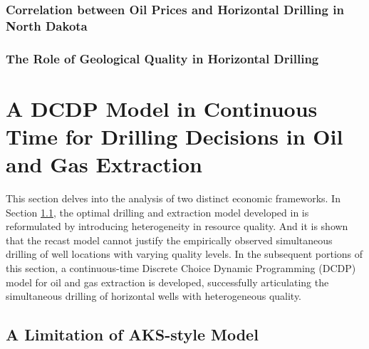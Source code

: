 \subsubsection{Correlation between Oil Prices and Horizontal Drilling in North Dakota}
\label{C3-SubSubSection:Correlation-between-Oil-Prices-and-Horizontal-Drilling-in-ND}


\subsubsection{The Role of Geological Quality in Horizontal Drilling}
\label{C3-SubSubSection:The-Role-of-Geological-Quality-in-Horizontal-Drilling}






\section{A DCDP Model in Continuous Time for Drilling Decisions in Oil and Gas Extraction}
\label{C3-Section:A-DCDP-Model-in-Continuous-Time}
This section delves into the analysis of two distinct economic frameworks. In Section \ref{C3-SubSection:A-Limitation-of-AKS-style-Model}, the optimal drilling and extraction model developed in \cite{Hotelling-under-Pressure_AKS_2018} is reformulated by introducing heterogeneity in resource quality. And it is shown that the recast model cannot justify the empirically observed simultaneous drilling of well locations with varying quality levels. In the subsequent portions of this section, a continuous-time Discrete Choice Dynamic Programming (DCDP) model for oil and gas extraction is developed, successfully articulating the simultaneous drilling of horizontal wells with heterogeneous quality.

\subsection{A Limitation of AKS-style Model}
\label{C3-SubSection:A-Limitation-of-AKS-style-Model}


